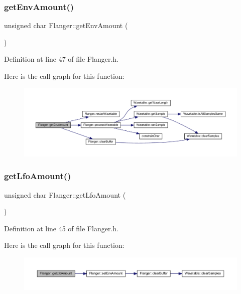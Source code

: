\subsubsection{\texorpdfstring{get\+Env\+Amount()}{getEnvAmount()}}
{\footnotesize\ttfamily unsigned char Flanger\+::get\+Env\+Amount (\begin{DoxyParamCaption}{ }\end{DoxyParamCaption})\hspace{0.3cm}{\ttfamily [inline]}}



Definition at line 47 of file Flanger.\+h.

Here is the call graph for this function\+:
\nopagebreak
\begin{figure}[H]
\begin{center}
\leavevmode
\includegraphics[width=350pt]{d5/d64/class_flanger_ae86b7a0721c3a9893f3b9ec5f4b6c0fb_cgraph}
\end{center}
\end{figure}
\mbox{\label{class_flanger_a6d6289cd3c9ef3cc997e83441a89194f}} 
\subsubsection{\texorpdfstring{get\+Lfo\+Amount()}{getLfoAmount()}}
{\footnotesize\ttfamily unsigned char Flanger\+::get\+Lfo\+Amount (\begin{DoxyParamCaption}{ }\end{DoxyParamCaption})\hspace{0.3cm}{\ttfamily [inline]}}



Definition at line 45 of file Flanger.\+h.

Here is the call graph for this function\+:
\nopagebreak
\begin{figure}[H]
\begin{center}
\leavevmode
\includegraphics[width=350pt]{d5/d64/class_flanger_a6d6289cd3c9ef3cc997e83441a89194f_cgraph}
\end{center}
\end{figure}
\mbox{\label{class_flanger_af0c970c914193ea326ca177869f508c1}} 
